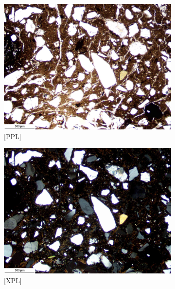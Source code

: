 \documentclass[a4paper]{article}
\begin{document}
\begin{figure}[H]
	\centering
	\begin{subfigure}[t]{.49\textwidth}
		\includegraphics[width=\textwidth]{ThinSections/57-5_4x_PPL.jpg}
		\caption{[PPL]}
	\end{subfigure}\hspace{.5em}\hfill
	\begin{subfigure}[t]{.49\textwidth}
		\includegraphics[width=\textwidth]{ThinSections/57-5_4x_XPL.jpg}
		\caption{[XPL]}
	\end{subfigure}
	\begin{subfigure}[t]{.49\textwidth}

\end{subfigure}
\end{figure}
\end{document}
